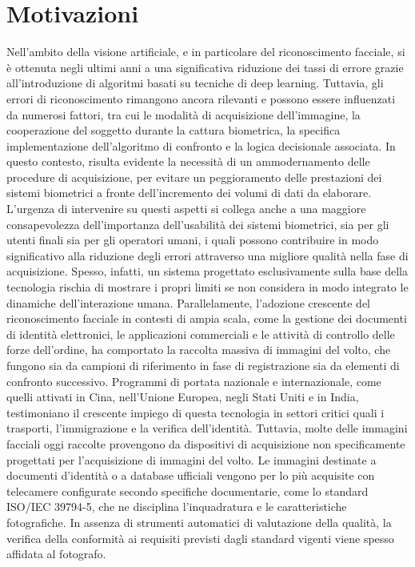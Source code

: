 \documentclass[12pt,a4paper,openright,twoside]{book}
\begin{document}
\section{Motivazioni}
Nell’ambito della visione artificiale, e in particolare del riconoscimento facciale, si è ottenuta negli ultimi anni a una significativa riduzione dei tassi di errore grazie all’introduzione di algoritmi basati su tecniche di deep learning.
Tuttavia, gli errori di riconoscimento rimangono ancora rilevanti e possono essere influenzati da numerosi fattori, tra cui le modalità di acquisizione dell’immagine, la cooperazione del soggetto durante la cattura biometrica, la specifica implementazione dell’algoritmo di confronto e la logica decisionale associata.
In questo contesto, risulta evidente la necessità di un ammodernamento delle procedure di acquisizione, per evitare un peggioramento delle prestazioni dei sistemi biometrici a fronte dell’incremento dei volumi di dati da elaborare.
L’urgenza di intervenire su questi aspetti si collega anche a una maggiore consapevolezza dell’importanza dell’usabilità dei sistemi biometrici, sia per gli utenti finali sia per gli operatori umani, i quali possono contribuire in modo significativo alla riduzione degli errori attraverso una migliore qualità nella fase di acquisizione.
Spesso, infatti, un sistema progettato esclusivamente sulla base della tecnologia rischia di mostrare i propri limiti se non considera in modo integrato le dinamiche dell’interazione umana.
Parallelamente, l’adozione crescente del riconoscimento facciale in contesti di ampia scala, come la gestione dei documenti di identità elettronici, le applicazioni commerciali e le attività di controllo delle forze dell’ordine, ha comportato la raccolta massiva di immagini del volto, che fungono sia da campioni di riferimento in fase di registrazione sia da elementi di confronto successivo.
Programmi di portata nazionale e internazionale, come quelli attivati in Cina, nell’Unione Europea, negli Stati Uniti e in India, testimoniano il crescente impiego di questa tecnologia in settori critici quali i trasporti, l’immigrazione e la verifica dell’identità.
Tuttavia, molte delle immagini facciali oggi raccolte provengono da dispositivi di acquisizione non specificamente progettati per l'acquisizione di immagini del volto.
Le immagini destinate a documenti d’identità o a database ufficiali vengono per lo più acquisite con telecamere configurate secondo specifiche documentarie, come lo standard ISO/IEC 39794-5, che ne disciplina l’inquadratura e le caratteristiche fotografiche.
In assenza di strumenti automatici di valutazione della qualità, la verifica della conformità ai requisiti previsti dagli standard vigenti viene spesso affidata al fotografo.
\end{document}
